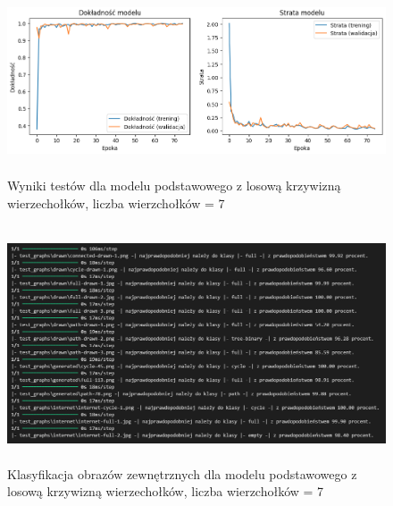 \begin{figure}[ht]
	\centering
	\includegraphics[height=5.5cm]{resources/tests/images/v3/base7_img.png}
	\caption{Wyniki testów dla modelu podstawowego z losową krzywizną wierzechołków, liczba wierzchołków = 7}
	\label{Fig:tests-base-1}
\end{figure}
\FloatBarrier

\begin{figure}[ht]
	\centering
	\includegraphics[height=7cm]{resources/tests/images/v3/base7_txt.png}
	\caption{Klasyfikacja obrazów zewnętrznych dla modelu podstawowego z losową krzywizną wierzechołków, liczba wierzchołków = 7}
	\label{Fig:tests-base-2}
\end{figure}
\FloatBarrier